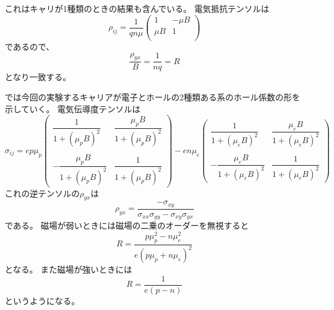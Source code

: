 \documentclass[11pt,dvipdfmx,a4paper]{jsarticle}
\numberwithin{equation}{section}
\begin{document}
これはキャリが1種類のときの結果も含んでいる。
電気抵抗テンソルは
\begin{equation}
	\rho_{ij} = \frac{1}{qn\mu}
	\begin{pmatrix}
		1 & -\mu B\\
		\mu B & 1\\
	\end{pmatrix}
\end{equation}
であるので、
\begin{equation}
	\frac{\rho_{yx}}{B} = \frac{1}{nq} = R
\end{equation}
となり一致する。

では今回の実験するキャリアが電子とホールの2種類ある系のホール係数の形を示していく。
電気伝導度テンソルは
\begin{equation}
	\sigma_{ij} =
	ep\mu_p
	\begin{pmatrix}
		\dfrac{1}{1+(\mu_p B)^2} & \dfrac{\mu_p B}{1+(\mu_p B)^2}\\
		&\\
		-\dfrac{\mu_p B}{1+(\mu_p B)^2} & \dfrac{1}{1+(\mu_p B)^2}
	\end{pmatrix}
	-
	en\mu_e
	\begin{pmatrix}
		\dfrac{1}{1+(\mu_e B)^2} & \dfrac{\mu_e B}{1+(\mu_e B)^2}\\
		&\\
		-\dfrac{\mu_e B}{1+(\mu_e B)^2} & \dfrac{1}{1+(\mu_e B)^2}
	\end{pmatrix}
\end{equation}
これの逆テンソルの\(\rho_{yx}\)は
\begin{equation}
	\rho_{yx} = \frac{-\sigma_{xy}}{\sigma_{xx}\sigma_{yy}-\sigma_{xy}\sigma_{yx}}
\end{equation}
である。
磁場が弱いときには磁場の二乗のオーダーを無視すると
\begin{equation}
	R = \frac{p\mu_p^2 - n\mu_e^2}{e(p\mu_p+n\mu_e)^2}
\end{equation}
となる。
また磁場が強いときには
\begin{equation}
	R = \frac{1}{e(p-n)}
\end{equation}
というようになる\cite{kondo-2009}。 %

\clearpage
\end{document}
